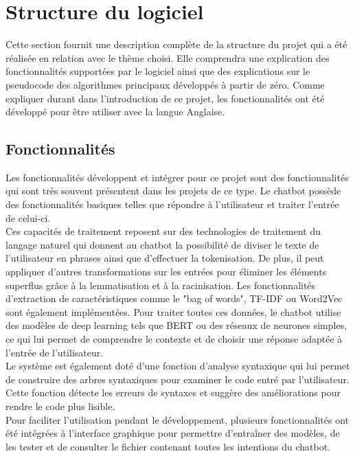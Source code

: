\documentclass{rapport}
\begin{document}
\newpage
\section{Structure du logiciel}
\label{implé}
Cette section fournit une description complète de la structure du projet qui a été réalisée en relation avec le thème choisi. Elle comprendra une explication des fonctionnalités supportées par le logiciel ainsi que des explications sur le pseudocode des algorithmes principaux développés à partir de zéro. Comme expliquer durant dans l'introduction de ce projet, les fonctionnalités ont été développé pour être utiliser avec la langue Anglaise.
\subsection{Fonctionnalités}
\label{subsec:fonc}
Les fonctionnalités développent et intégrer pour ce projet sont des fonctionnalités qui sont très souvent présentent dans les projets de ce type. Le chatbot possède des fonctionnalités basiques telles que répondre à l'utilisateur et traiter l'entrée de celui-ci.\\

Ces capacités de traitement reposent sur des technologies de traitement du langage naturel qui donnent au chatbot la possibilité de diviser le texte de l'utilisateur en phrases ainsi que d'effectuer la tokenisation. De plus, il peut appliquer d'autres transformations sur les entrées pour éliminer les éléments superflus grâce à la lemmatisation et à la racinisation. Les fonctionnalités d'extraction de caractéristiques comme le "bag of words", TF-IDF ou Word2Vec sont également implémentées. Pour traiter toutes ces données, le chatbot utilise des modèles de deep learning tels que BERT ou des réseaux de neurones simples, ce qui lui permet de comprendre le contexte et de choisir une réponse adaptée à l'entrée de l'utilisateur.\\

Le système est également doté d'une fonction d'analyse syntaxique qui lui permet de construire des arbres syntaxiques pour examiner le code entré par l'utilisateur. Cette fonction détecte les erreurs de syntaxes et suggère des améliorations pour rendre le code plus lisible.\\

Pour faciliter l'utilisation pendant le développement, plusieurs fonctionnalités ont été intégrées à l'interface graphique pour permettre d'entraîner des modèles, de les tester et de consulter le fichier contenant toutes les intentions du chatbot.
\end{document}
